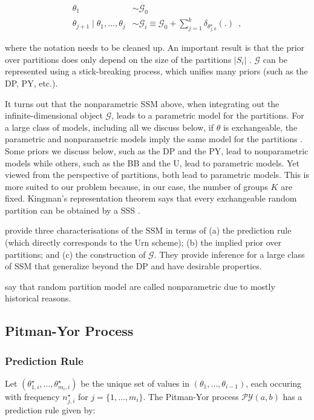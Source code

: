 \documentclass[11pt,a4paper]{article}
\theoremstyle{definition} %
\theoremstyle{case}
\begin{document}
\begin{align}
    \theta_1 &\sim \mathcal{G}_0 \\
    \theta_{j + 1} \mid \theta_1, \ldots, \theta_j  &\sim \mathcal{G}_i \equiv \mathcal{G}_0 + \sum_{j=1}^k \delta_{\theta^{\star}_{j, k}}(.) \enspace ,
\end{align}

where the notation needs to be cleaned up. An important result is that the prior over partitions does only depend on the size of the partitions $|S_i|$ \parencite{quintana2006predictive}. $\mathcal{G}$ can be represented using a stick-breaking process, which unifies many priors (such as the DP, PY, etc.).

It turns out that the nonparametric SSM above, when integrating out the infinite-dimensional object $\mathcal{G}$, leads to a parametric model for the partitions. For a large class of models, including all we discuss below, if $\theta$ is exchangeable, the parametric and nonparametric models imply the same model for the partitions \parencite{quintana2006predictive}. Some priors we discuss below, such as the DP and the PY, lead to nonparametric models while others, such as the BB and the U, lead to parametric models. Yet viewed from the perspective of partitions, both lead to parametric models. This is more suited to our problem because, in our case, the number of groups $K$ are fixed. Kingman's representation theorem says that every exchangeable random partition can be obtained by a SSS \parencite[e.g.,][]{lee2013defining}.

\textcite{lee2013defining} provide three characterisations of the SSM in terms of (a) the prediction rule (which directly corresponds to the Urn scheme); (b) the implied prior over partitions; and (c) the construction of $\mathcal{G}$. They provide inference for a large class of SSM that generalize beyond the DP and have desirable properties.

\textcite{muller2013bayesian} say that random partition model are called nonparametric due to mostly historical reasons.


\subsection{Pitman-Yor Process}
\subsubsection{Prediction Rule}
Let $(\theta^{\star}_{1, i}, \ldots, \theta^{\star}_{m_i, i})$ be the unique set of values in $(\theta_1, \ldots, \theta_{i-1})$, each occuring with frequency $n^{\star}_{j, i}$ for $j = \{1, \ldots, m_i\}$. The Pitman-Yor process $\mathcal{PY}(a, b)$ has a prediction rule given by:
\end{document}
